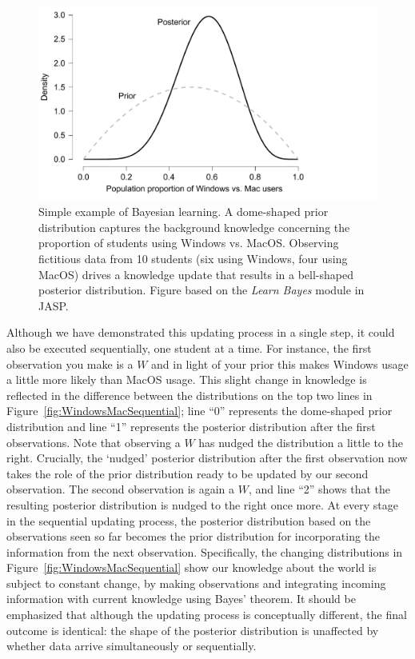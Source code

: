 \documentclass[man]{apa7}
\begin{document}
\begin{figure}[h]
\begin{center}
\includegraphics[width = .785\paperwidth]{WindowsMacPriorPosterior.pdf}
\caption{Simple example of Bayesian learning. A dome-shaped prior distribution captures the background knowledge concerning the proportion of students using Windows vs. MacOS. Observing fictitious data from 10 students (six using Windows, four using MacOS) drives a knowledge update that results in a bell-shaped posterior distribution. Figure based on the \emph{Learn Bayes} module in JASP.}
\label{fig:WindowsMacPriorPosterior}
\end{center}
\end{figure}

Although we have demonstrated this updating process in a single step, it could also be executed sequentially, one student at a time. For instance, the first observation you make is a $W$ and in light of your prior this makes Windows usage a little more likely than MacOS usage. This slight change in knowledge is reflected in the difference between the distributions on the top two lines in Figure~\ref{fig:WindowsMacSequential}; line ``0'' represents the dome-shaped prior distribution and line ``1'' represents the posterior distribution after the first observations. Note that observing a $W$ has nudged the distribution a little to the right. Crucially, the `nudged' posterior distribution after the first observation now takes the role of the prior distribution ready to be updated by our second observation. The second observation is again a $W$, and line ``2'' shows that the resulting posterior distribution is nudged to the right once more. At every stage in the sequential updating process, the posterior distribution based on the observations seen so far becomes the prior distribution for incorporating the information from the next observation. Specifically, the changing distributions in Figure~\ref{fig:WindowsMacSequential} show our knowledge about the world is subject to constant change, by making observations and integrating incoming information with current knowledge using Bayes' theorem. It should be emphasized that although the updating process is conceptually different, the final outcome is identical: the shape of the posterior distribution is unaffected by whether data arrive simultaneously or sequentially.
\end{document}
